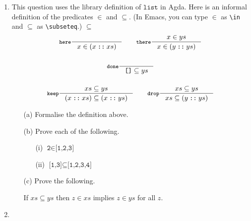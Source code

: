 \documentclass{examhons2018}
\begin{document}
\begin{enumerate}

\item \rubricqA

\newcommand{\key}{\texttt}
\newcommand{\List}{\key{list}}
\newcommand{\nil}{\texttt{[]}}
\newcommand{\cons}{\mathbin{\key{::}}}
\newcommand{\member}{\key{member}}
\newcommand{\sublist}{\key{sublist}}

This question uses the library definition of $\List$ in Agda.
Here is an informal definition of the predicates $\in$
and $\subseteq$.  (In Emacs, you can type $\in$ as \verb$\in$ and $\subseteq$ as \verb$\subseteq$.)
$\subseteq$
\begin{gather*}
\inference[$\key{here}$]
  {}
  {x \in (x \cons xs)}
\qquad
\inference[$\key{there}$]
  {x \in ys}
  {x \in (y \cons ys)}
\\~\\
\inference[$\key{done}$]
  {}
  {\nil \subseteq ys}
\\~\\
\inference[$\key{keep}$]
  {xs \subseteq ys}
  {(x \cons xs) \subseteq (x \cons ys)}
\qquad
\inference[$\key{drop}$]
  {xs \subseteq ys}
  {xs \subseteq (y \cons ys)}
\end{gather*}

\begin{itemize}

\item[(a)] Formalise the definition above.

\item[(b)] Prove each of the following.
  \begin{itemize}
  \item[(i)]  $\key{2} \in \key{[1,2,3]}$
  \item[(ii)]  $\key{[1,3]} \subseteq \key{[1,2,3,4]}$
  \end{itemize}

\item[(c)] Prove the following.
\begin{center}
If $xs \subseteq ys$ then $z \in xs$ implies $z \in ys$ for all $z$.
\end{center}

\end{itemize}

\newpage

\item \rubricqB

\newcommand{\Tree}{\texttt{Tree}}
\newcommand{\leaf}{\texttt{leaf}}
\newcommand{\branch}{\texttt{branch}}
\newcommand{\CASET}{\texttt{caseT}}
\newcommand{\caseT}[6]{\texttt{case}~#1~\texttt{[leaf}~#2~\Rightarrow~#3~\texttt{|}~#4~\texttt{branch}~#5~\Rightarrow~#6\texttt{]}}
\newcommand{\ubar}{\texttt{\underline{~}}}
\newcommand{\comma}{\,\texttt{,}\,}
\newcommand{\V}{\texttt{V}}
\newcommand{\dash}{\texttt{-}}
\newcommand{\Value}{\texttt{Value}}
\newcommand{\becomes}{\longrightarrow}
\newcommand{\subst}[3]{#1~\texttt{[}~#2~\texttt{:=}~#3~\texttt{]}}



\end{enumerate}
\end{document}
